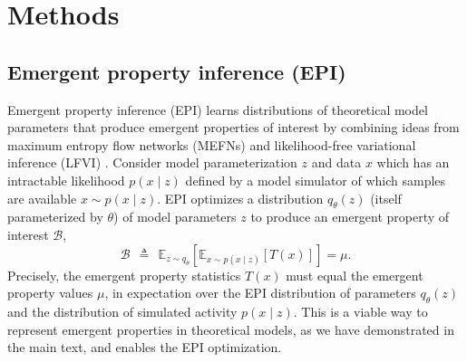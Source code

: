 \documentclass[11pt]{article}
\begin{document}



\newpage 

\section{Methods}

\subsection{Emergent property inference (EPI)}\label{methods_EPI}
Emergent property inference (EPI) learns distributions of theoretical model parameters that produce emergent properties of interest by combining ideas from maximum entropy flow networks (MEFNs) \cite{loaiza2017maximum} and likelihood-free variational inference (LFVI) \cite{tran2017hierarchical}.  
Consider model parameterization $z$ and data $x$ which has an intractable likelihood $p(x \mid z)$ defined by a model simulator of which samples are available $x \sim p(x \mid z)$.  
EPI optimizes a distribution $q_\theta(z)$ (itself parameterized by $\theta$) of model parameters $z$ to produce an emergent property of interest $\mathcal{B}$,
\begin{equation}
\mathcal{B} ~~\triangleq~~  \mathbb{E}_{z \sim q_\theta}\left[ \mathbb{E}_{x\sim p(x \mid z)}\left[T(x)\right] \right] = \mu.
\end{equation}
Precisely, the emergent property statistics $T(x)$ must equal the emergent property values $\mu$, in expectation over the EPI distribution of parameters $q_\theta(z)$ and the distribution of simulated activity $p(x \mid z)$.  This is a viable way to represent emergent properties in theoretical models, as we have demonstrated in the main text, and enables the EPI optimization.
\end{document}

